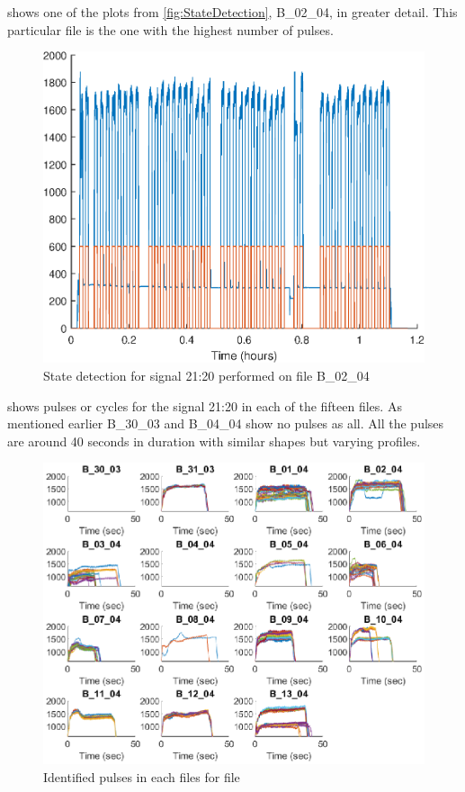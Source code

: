 \documentclass[]{article}
\begin{document}
 shows one of the plots from \cref{fig:StateDetection}, B\_02\_04, in greater detail. This particular file is the one with the highest number of pulses.

\begin{figure}[H]
    \centering
    \includegraphics[scale=0.75]{figures/StateDetectionFig_B_02_04.eps}
    \caption{State detection for signal 21:20 performed on file B\_02\_04}
    \label{fig:StateDetectionFig_B_02_04}
\end{figure}

 shows pulses or cycles for the signal 21:20 in each of the fifteen files. As mentioned earlier B\_30\_03 and B\_04\_04 show no pulses as all. All the pulses are around 40 seconds in duration with similar shapes but varying profiles.
 
\begin{figure}[H]
    \centering
    \includegraphics[width=\textwidth, height=\textheight, keepaspectratio]{figures/IdentifiedPulsesFig.eps}
    \caption{Identified pulses in each files for file}
    \label{fig:IdentifiedPulses}
\end{figure}
\end{document}
